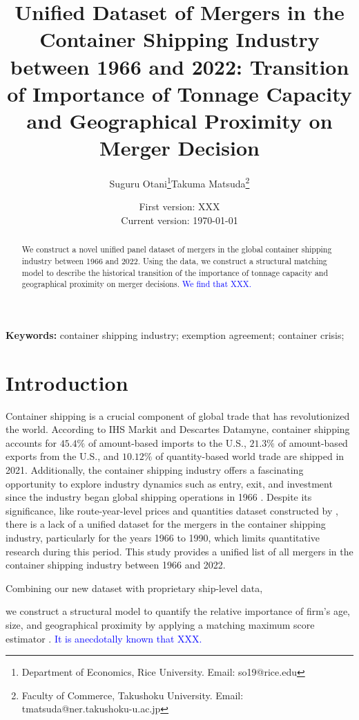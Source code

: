 \documentclass[10pt]{article}
\title{Unified Dataset of Mergers in the Container Shipping Industry between 1966 and 2022: Transition of Importance of Tonnage Capacity and Geographical Proximity on Merger Decision}
\author{Suguru Otani\thanks{Department of Economics, Rice University. Email: so19@rice.edu}\quad  Takuma Matsuda\thanks{Faculty of Commerce, Takushoku University. Email: tmatsuda@ner.takushoku-u.ac.jp}}
\date{
First version: XXX\\
Current version: \today
}
\begin{document}
\maketitle

\begin{abstract}
We construct a novel unified panel dataset of mergers in the global container shipping industry between 1966 and 2022. Using the data, we construct a structural matching model \citep{fox2018qe} to describe the historical transition of the importance of tonnage capacity and geographical proximity on merger decisions. 
\textcolor{blue}{We find that XXX.}
\end{abstract} 

\vspace{0.1in}
\noindent\textbf{Keywords:} container shipping industry; exemption agreement; container crisis; 
\vspace{0in}


\section{Introduction}

Container shipping is a crucial component of global trade that has revolutionized the world. 
According to IHS Markit and Descartes Datamyne, container shipping accounts for $45.4 \%$ of amount-based imports to the U.S., $21.3 \%$ of amount-based exports from the U.S., and $10.12 \%$ of quantity-based world trade are shipped in 2021. 
Additionally, the container shipping industry offers a fascinating opportunity to explore industry dynamics such as entry, exit, and investment since the industry began global shipping operations in 1966 \citep{otani2023industry}. 
Despite its significance, like route-year-level prices and quantities dataset constructed by \cite{matsuda2022unified}, there is a lack of a unified dataset for the mergers in the container shipping industry, particularly for the years 1966 to 1990, which limits quantitative research during this period. 
This study provides a unified list of all mergers in the container shipping industry between 1966 and 2022.

Combining our new dataset with proprietary ship-level data, 


we construct a structural model to quantify the relative importance of firm's age, size, and geographical proximity by applying a matching maximum score estimator \cite{fox2018qe}. 
\textcolor{blue}{It is anecdotally known that XXX. }
\end{document}

